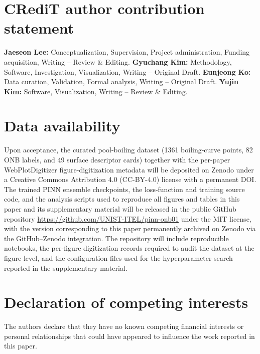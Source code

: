 \documentclass[review,1p,12pt,a4paper]{elsarticle}
\begin{document}
\section*{CRediT author contribution statement}
\textbf{Jaeseon Lee:} Conceptualization, Supervision, Project
administration, Funding acquisition, Writing -- Review \& Editing.
\textbf{Gyuchang Kim:} Methodology, Software, Investigation,
Visualization, Writing -- Original Draft.
\textbf{Eunjeong Ko:} Data curation, Validation, Formal analysis,
Writing -- Original Draft.
\textbf{Yujin Kim:} Software, Visualization, Writing -- Review \&
Editing.

\section*{Data availability}
Upon acceptance, the curated pool-boiling dataset (\num{1361}
boiling-curve points, \num{82} ONB labels, and \num{49} surface
descriptor cards) together with the per-paper
WebPlotDigitizer figure-digitization metadata will be deposited on
Zenodo under a Creative Commons Attribution 4.0 (CC-BY-4.0) license
with a permanent DOI. The trained PINN ensemble checkpoints, the
loss-function and training source code, and the analysis scripts
used to reproduce all figures and tables in this paper and its
supplementary material will be released in the public GitHub
repository \url{https://github.com/UNIST-ITEL/pinn-onb01} under the
MIT license, with the version corresponding to this paper
permanently archived on Zenodo via the GitHub--Zenodo integration.
The repository will include reproducible notebooks, the per-figure
digitization records required to audit the dataset at the figure
level, and the configuration files used for the hyperparameter
search reported in the supplementary material.

\section*{Declaration of competing interests}
The authors declare that they have no known competing financial
interests or personal relationships that could have appeared to
influence the work reported in this paper.


\end{document}
